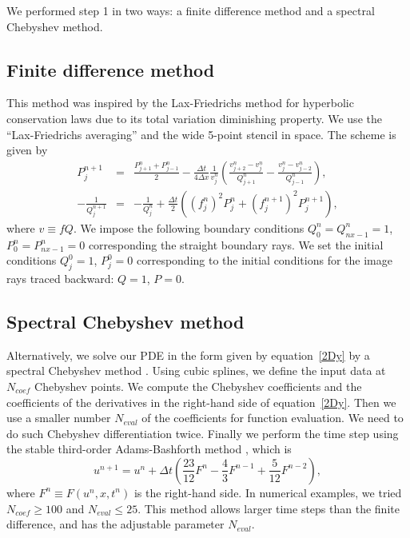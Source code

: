 We performed step 1 in two ways: a finite difference method and 
a spectral Chebyshev method.

\subsection{Finite difference method}
This method was inspired by the Lax-Friedrichs method for hyperbolic
conservation laws \cite{lax} due to its total variation diminishing property.
We use the ``Lax-Friedrichs averaging'' and the wide 5-point
stencil in space. The scheme is given by
\begin{eqnarray}
P^{n+1}_j&=&\frac{P_{j+1}^n+P_{j-1}^n}{2}
-\frac{\Delta t}{4\Delta x}
\frac{1}{v^n_j}\left(\frac{v^n_{j+2}-v^n_j}{Q^n_{j+1}}-
\frac{v^n_{j}-v^n_{j-2}}{Q^n_{j-1}}\right),\label{2dlfp}\\
-\frac{1}{Q^{n+1}_j}&=&-\frac{1}{Q^n_j}+
\frac{\Delta t}{2}\left((f_j^n)^2P_j^n+(f_j^{n+1})^2P_j^{n+1}\right),
\label{2dlfq}
\end{eqnarray}
where $v\equiv fQ$.
We impose the following boundary conditions $Q^n_0=Q^n_{nx-1}=1$, 
$P_0^n=P^n_{nx-1}=0$
corresponding the straight boundary rays.
We set the initial conditions 
$Q_j^0=1$, $P^0_j=0$ corresponding to the initial conditions 
for the image rays traced backward: $Q=1$, $P=0$.


\subsection{Spectral Chebyshev method}
Alternatively, we solve our PDE
in the form given by equation~\ref{2Dy}
by a spectral Chebyshev method \cite{boyd}.
Using cubic splines, we define the input data at $N_{coef}$ 
Chebyshev points.
We compute the Chebyshev coefficients and the coefficients of the
derivatives in the right-hand side of equation~\ref{2Dy}. 
Then we use a smaller number $N_{eval}$ of the 
coefficients for function evaluation. 
We need to do such Chebyshev differentiation twice.
Finally we perform the time step using 
the stable third-order Adams-Bashforth method
\cite{boyd},
which is
\begin{equation}
\label{adams}
u^{n+1}=u^n+\Delta t\left(\frac{23}{12}F^n-
\frac{4}{3}F^{n-1}+\frac{5}{12}F^{n-2}\right),
\end{equation}
where $F^n\equiv F(u^{n},x,t^{n})$ is the right-hand side.
In numerical examples, we tried $N_{coef}\ge 100$ and $N_{eval}\le 25$.
This method allows larger time steps than the finite difference, and 
has the adjustable parameter $N_{eval}$.


